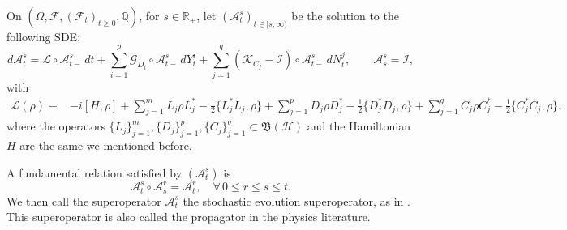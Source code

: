 \documentclass[aihp,12pt]{imsart}
\newcommand{\Hc}{\mathcal{H}}
\newcommand{\Lc}{\mathcal{L}}
\newcommand{\Bf}{\mathfrak{B}}
\theoremstyle{theorem}
\theoremstyle{definition}
\theoremstyle{remark}
\begin{document}
On $(\Omega,\mathcal F,(\mathcal F_t)_{t\geq0},\mathbb Q)$, for $s\in\mathbb R_+$, let $(\mathcal A_t^s)_{t\in[s,\infty)}$ be the solution to the following SDE:
\begin{equation}\label{eq_defS}
d \mathcal A_{t}^s= \mathcal L\circ\mathcal A_{t-}^{s}\,d t+\sum_{i=1}^p \mathcal G_{D_i}\circ \mathcal A_{t-}^{s}\,d Y^i_t+\sum_{j=1}^q(\mathcal K_{C_j}-\mathcal I)\circ \mathcal A_{t-}^{s}\,d N^j_t,\qquad \mathcal A_s^s=\mathcal I,
\end{equation}
with
\begin{equation}
    \begin{split}
        \Lc(\rho) \equiv&  -i[H,\rho] + \sum_{j=1}^m L_j\rho L_j^*-\frac{1}{2}\{L_j^* L_j,\rho\} + \sum_{j=1}^p D_j\rho D_j^*-\frac{1}{2}\{D_j^* D_j,\rho\} + \sum_{j=1}^q C_j\rho C_j^*-\frac{1}{2}\{C_j^* C_j,\rho\}.
    \end{split}
\end{equation}
where the operators $\{L_j\}_{j=1}^m,\{D_j\}_{j=1}^p,\{C_j\}_{j=1}^q \subset\Bf(\Hc)$ and the Hamiltonian $H$ are the same we mentioned before.

A fundamental relation satisfied by $(\mathcal A_{t}^s)$ is 
$$\mathcal A_t^s\circ\mathcal A_s^r=\mathcal A_t^r,\quad \forall\, 0\leq r\leq s\leq t.$$
We then call the superoperator $\mathcal A_t^s$ the stochastic evolution superoperator, as in \cite{barchielli2009quantum}.  This superoperator is also called the propagator in the physics literature. 
\end{document}
